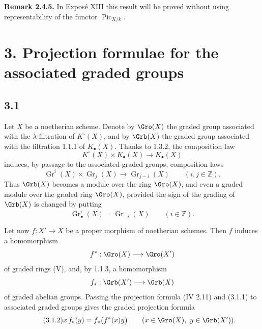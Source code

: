 \documentclass[11pt]{article}
\newcommand{\Gr}{\operatorname{Gr}}
\providecommand{\Pic}{\operatorname{Pic}}
\providecommand{\Gr}{\operatorname{Gr}}
\providecommand{\Gr}{\operatorname{G}}
\begin{document}
\textbf{Remark 2.4.5.} In Exposé XIII this result will be proved without using representability of the functor \(\Pic_{X/k}\).

\section*{3. Projection formulae for the associated graded groups}

\subsection*{3.1}
Let \(X\) be a noetherian scheme. Denote by \(\Gro(X)\) the graded group associated with the \(\lambda\)-filtration of \(K^\circ(X)\), and by \(\Grb(X)\) the graded group associated with the filtration 1.1.1 of \(K_\bullet(X)\). Thanks to 1.3.2, the composition law
\[
 K^\circ(X)\times K_\bullet(X)\longrightarrow K_\bullet(X)
\]
induces, by passage to the associated graded groups, composition laws
\begin{equation}\tag{3.1.1}
 \Gr^i(X)\times \Gr_j(X)\longrightarrow \Gr_{j-i}(X)\qquad (i,j\in\mathbb Z).
\end{equation}
Thus \(\Grb(X)\) becomes a module over the ring \(\Gro(X)\), and even a graded module over the graded ring \(\Gro(X)\), provided the sign of the grading of \(\Grb(X)\) is changed by putting
\[
 \Gr^i_\bullet(X)=\Gr_{-i}(X)\qquad (i\in\mathbb Z).
\]

Let now \(f:X'\to X\) be a proper morphism of noetherian schemes. Then \(f\) induces a homomorphism
\[
 f^*:\Gro(X)\longrightarrow\Gro(X')
\]
of graded rings (V), and, by 1.1.3, a homomorphism
\[
 f_*:\Grb(X')\longrightarrow\Grb(X)
\]
of graded abelian groups. Passing the projection formula (IV 2.11) and (3.1.1) to associated graded groups gives the graded projection formula
\begin{equation}\tag{3.1.2}
 x\,f_*(y)=f_*\bigl(f^*(x)y\bigr)
 \qquad (x\in\Gro(X),\ y\in\Grb(X')).
\end{equation}
\end{document}
